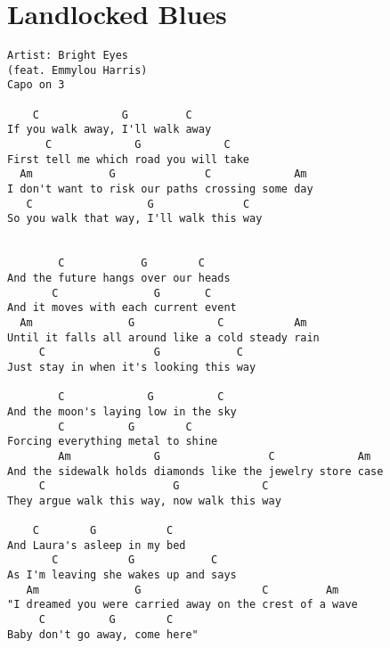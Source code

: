 \documentclass[leqno]{memoir}
\begin{document}
\chapter{Landlocked Blues}
\begin{verbatim}
Artist: Bright Eyes
(feat. Emmylou Harris)
Capo on 3

    C             G         C
If you walk away, I'll walk away
      C             G             C
First tell me which road you will take
  Am            G              C             Am
I don't want to risk our paths crossing some day
   C                  G              C
So you walk that way, I'll walk this way


        C            G        C
And the future hangs over our heads
       C               G       C
And it moves with each current event
  Am               G             C           Am
Until it falls all around like a cold steady rain
     C                 G            C
Just stay in when it's looking this way

        C             G          C
And the moon's laying low in the sky
        C          G        C
Forcing everything metal to shine
        Am             G                 C             Am
And the sidewalk holds diamonds like the jewelry store case
     C                    G             C
They argue walk this way, now walk this way

    C        G           C
And Laura's asleep in my bed
       C           G            C
As I'm leaving she wakes up and says
   Am               G                   C         Am
"I dreamed you were carried away on the crest of a wave
     C          G        C
Baby don't go away, come here"
\end{verbatim}
\newpage
\end{document}
